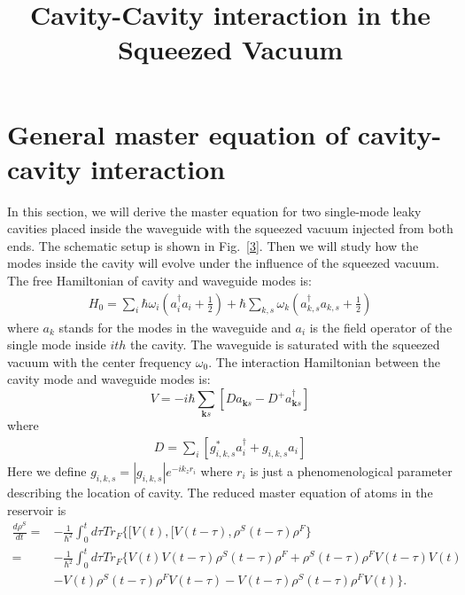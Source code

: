 \documentclass[aps,showpacs,onecolumn,twoside,groupedaddress]{revtex4}
\let\vec\bm
\begin{document}
\title{Cavity-Cavity interaction in the Squeezed Vacuum}
\maketitle 





\section{General master equation of cavity-cavity interaction}
In this section, we will derive the master equation for two single-mode leaky cavities placed inside the waveguide with the squeezed vacuum injected from both ends. The schematic setup is shown in Fig.~\ref{3}. Then we will study how the modes inside the cavity will evolve under the influence of the squeezed vacuum. The free Hamiltonian of cavity and waveguide modes is:
\begin{equation}
\label{eq5a}
\begin{split}
H_{0}=\sum_{i}\hbar\omega_i(a_i^{\dagger}a_{i}+\frac{1}{2})+\hbar\sum_{k,s}\omega_{k}(a_{k,s}^{\dagger}a_{k,s}+\frac{1}{2})
\end{split}
\end{equation}
where $a_k$ stands for the modes in the waveguide and $a_i$ is the field operator of the single mode inside $ith$ the cavity. The waveguide is saturated with the squeezed vacuum with the center frequency $\omega_0$.  The interaction Hamiltonian between the cavity mode and waveguide modes is:
\begin{equation}
\label{eqa0}
V=-i\hbar\sum_{\vec{k}s}[Da_{\vec{k}s}-D^{+}a_{\vec{k}s}^{\dagger}]
\end{equation}
where
\begin{equation}
\label{eqa1}
\begin{gathered}
 D=\underset{i}{\sum}[g_{i,k,s}^{*}a_{i}^{\dagger}+g_{i,k,s}a_{i}]
\end{gathered}
\end{equation}
Here we define $g_{i,k,s}=|g_{i,k,s}|e^{-ik_z r_i}$ where $r_i$ is just a phenomenological parameter describing the location of cavity. The reduced master equation of atoms in the reservoir is\cite{Scully1997}
\begin{equation}
\label{eqa2}
\begin{split}
\frac{d\rho^{S}}{dt}=&-\frac{1}{\hbar^{2}}\int_{0}^{t}d\tau Tr_{F}\{[V(t),[V(t-\tau),\rho^{S}(t-\tau)\rho^{F}\}\\
=&-\frac{1}{\hbar^{2}}\int_{0}^{t}d\tau Tr_{F}\{V(t)V(t-\tau)\rho^{S}(t-\tau)\rho^{F}+\rho^{S}(t-\tau)\rho^{F}V(t-\tau)V(t)\\
&-V(t)\rho^{S}(t-\tau)\rho^{F}V(t-\tau)-V(t-\tau)\rho^{S}(t-\tau)\rho^{F}V(t)\}.
\end{split}
\end{equation} 
\end{document}
